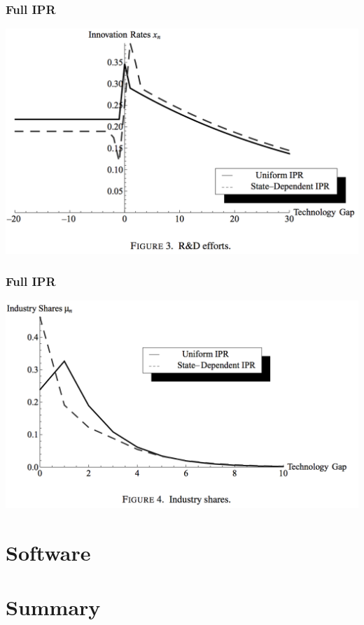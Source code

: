 \documentclass{beamer}
\begin{document}
\begin{frame}[t]\frametitle{Full IPR} 
  \begin{center}
    \includegraphics[scale=.28]{full_ipr_rnd.png}
    \label{fig:full_ipr}
  \end{center}
\end{frame}

\begin{frame}[t]\frametitle{Full IPR} 
  \begin{center}
    \includegraphics[scale=.28]{full_ipr_distbn.png}
    \label{fig:full_ipr}
  \end{center}
\end{frame}


\section{Software}
\label{sec:software}

\section{Summary}
\label{sec:summary}
\end{document}
